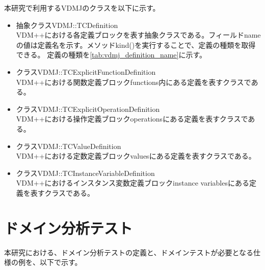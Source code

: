 \documentclass[uplatex, report, a4j, 10pt]{jsbook}
\begin{document}
本研究で利用するVDMJのクラスを以下に示す。

\begin{itemize}
  \item 抽象クラスVDMJ::TCDefinition\\
        VDM++における各定義ブロックを表す抽象クラスである。フィールドnameの値は定義名を示す。メソッドkind()を実行することで、定義の種類を取得できる。
        定義の種類を\ref{tab:vdmj_definition_name}に示す。
  \item クラスVDMJ::TCExplicitFunctionDefinition\\
        VDM++における関数定義ブロックfunctions内にある定義を表すクラスである。
  \item クラスVDMJ::TCExplicitOperationDefinition\\
        VDM++における操作定義ブロックoperationsにある定義を表すクラスである。
  \item クラスVDMJ::TCValueDefinition\\
        VDM++における定数定義ブロックvaluesにある定義を表すクラスである。
  \item クラスVDMJ::TCInstanceVariableDefinition\\
        VDM++におけるインスタンス変数定義ブロックinstance variablesにある定義を表すクラスである。
\end{itemize}


\section{ドメイン分析テスト}\label{cha:domain}
本研究における、ドメイン分析テストの定義と、ドメインテストが必要となる仕様の例を、以下で示す。
\end{document}
